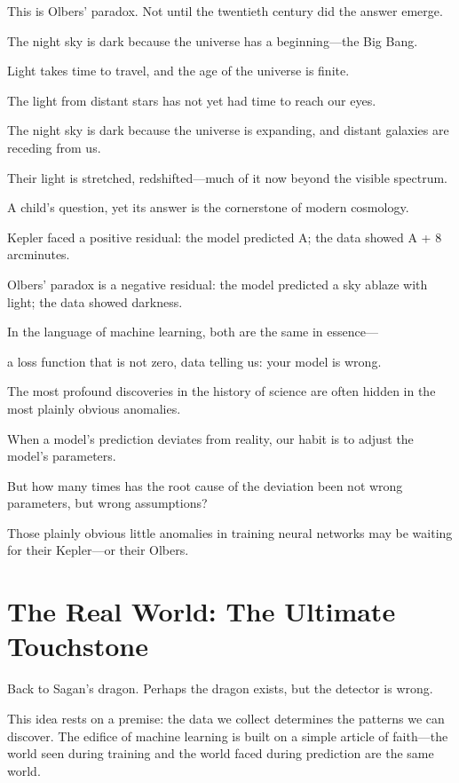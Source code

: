 This is Olbers' paradox. Not until the twentieth century did the answer emerge.

The night sky is dark because the universe has a beginning---the Big Bang.

Light takes time to travel, and the age of the universe is finite.

The light from distant stars has not yet had time to reach our eyes.

The night sky is dark because the universe is expanding, and distant galaxies are receding from us.

Their light is stretched, redshifted---much of it now beyond the visible spectrum.

A child's question, yet its answer is the cornerstone of modern cosmology.

\vspace{1em}

Kepler faced a positive residual: the model predicted A; the data showed A + 8 arcminutes.

Olbers' paradox is a negative residual: the model predicted a sky ablaze with light; the data showed darkness.

In the language of machine learning, both are the same in essence---

a loss function that is not zero, data telling us: your model is wrong.

The most profound discoveries in the history of science are often hidden in the most plainly obvious anomalies.

\begin{thinkbox}
When a model's prediction deviates from reality, our habit is to adjust the model's parameters.

But how many times has the root cause of the deviation been not wrong parameters, but wrong assumptions?

Those plainly obvious little anomalies in training neural networks may be waiting for their Kepler---or their Olbers.
\end{thinkbox}

\newpage
\section{The Real World: The Ultimate Touchstone}

Back to Sagan's dragon. Perhaps the dragon exists, but the detector is wrong.

This idea rests on a premise: the data we collect determines the patterns we can discover. The edifice of machine learning is built on a simple article of faith---the world seen during training and the world faced during prediction are the same world.

